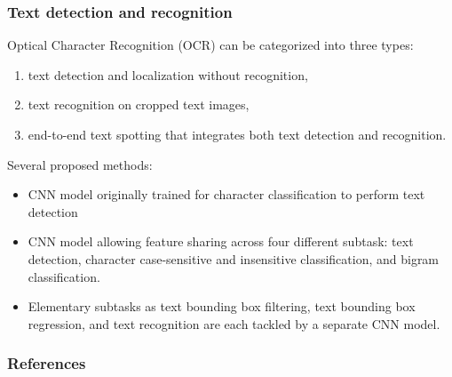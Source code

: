 \begin{frame}
	\frametitle{Text detection and recognition}
	
	
	Optical Character Recognition (OCR) can be categorized into three types: 
	\begin{enumerate}
		\item text detection and localization without recognition,
		\item text recognition on cropped text images,
		\item  end-to-end text spotting that integrates both text detection and recognition.
	\end{enumerate}
	
	\bigskip 
	
	Several proposed methods: 
	
	\begin{itemize}
		\item CNN model originally trained for character classification to perform text detection
		
		
		\item CNN model allowing feature sharing across four different subtask: text detection, character case-sensitive and insensitive classification, and bigram classification.
		
		
		\item Elementary subtasks as text bounding box filtering, text bounding box regression, and text recognition are each tackled by a separate CNN model.
		
	\end{itemize}
	
\end{frame}











\begin{frame}[allowframebreaks]
	\frametitle{References}
\printbibliography
\end{frame}








